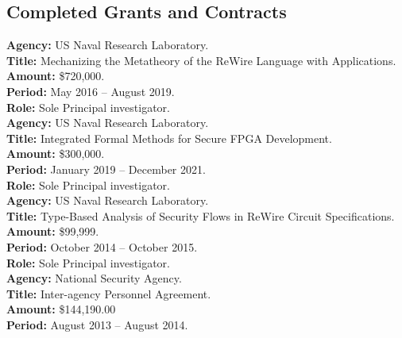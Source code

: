\documentclass[12pt]{article} %
\begin{document}
%

\subsection*{Completed Grants and Contracts}


{\bf Agency:} US Naval Research Laboratory.
\\
{\bf Title:} Mechanizing the Metatheory of the ReWire Language with Applications.
\\
{\bf Amount:} \$720,000.
\\
{\bf Period:}   May 2016  --  August 2019.
\\
{\bf Role:}    Sole  Principal investigator.
\\

{\bf Agency:} US Naval Research Laboratory.
\\
{\bf Title:} Integrated Formal Methods for Secure FPGA Development.
\\
{\bf Amount:} \$300,000.
\\
{\bf Period:}   January 2019  --  December 2021.
\\
{\bf Role:}    Sole  Principal investigator.
\\


{\bf Agency:} US Naval Research Laboratory.
\\
{\bf Title:} Type-Based Analysis of Security Flows in ReWire Circuit Specifications.
\\
{\bf Amount:} \$99,999.
\\
{\bf Period:}   October 2014  --  October 2015.
\\
{\bf Role:}     Sole Principal investigator.
\\

{\bf Agency:} National Security Agency.\\
{\bf Title:} Inter-agency Personnel Agreement.\\
{\bf Amount:} \$144,190.00 \\
{\bf Period:} August 2013 -- August 2014.
\\
\end{document}
